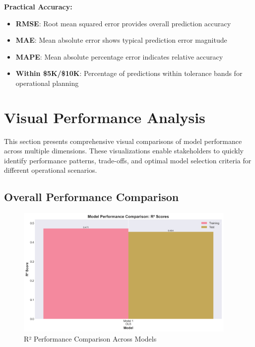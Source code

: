 \textbf{Practical Accuracy:}
\begin{itemize}
    \item \textbf{RMSE}: Root mean squared error provides overall prediction accuracy
    \item \textbf{MAE}: Mean absolute error shows typical prediction error magnitude
    \item \textbf{MAPE}: Mean absolute percentage error indicates relative accuracy
    \item \textbf{Within \$5K/\$10K}: Percentage of predictions within tolerance bands for operational planning
\end{itemize}


\section{Visual Performance Analysis}

This section presents comprehensive visual comparisons of model performance across multiple dimensions. These visualizations enable stakeholders to quickly identify performance patterns, trade-offs, and optimal model selection criteria for different operational scenarios.

\subsection{Overall Performance Comparison}

\begin{figure}[h!]
\centering
\includegraphics[width=0.95\textwidth]{figures/plot_a_r2_comparison.png}
\caption{R² Performance Comparison Across Models}
\label{fig:r2_comparison}
\end{figure}

